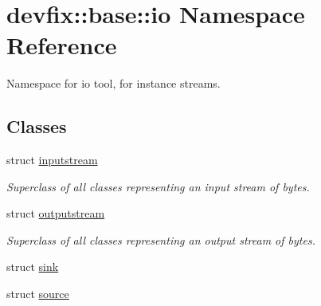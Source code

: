 \hypertarget{namespacedevfix_1_1base_1_1io}{}\section{devfix\+:\+:base\+:\+:io Namespace Reference}
\label{namespacedevfix_1_1base_1_1io}


Namespace for io tool, for instance streams.  


\subsection*{Classes}
\begin{DoxyCompactItemize}
\item 
struct \hyperlink{structdevfix_1_1base_1_1io_1_1inputstream}{inputstream}
\begin{DoxyCompactList}\small\item\em Superclass of all classes representing an input stream of bytes. \end{DoxyCompactList}\item 
struct \hyperlink{structdevfix_1_1base_1_1io_1_1outputstream}{outputstream}
\begin{DoxyCompactList}\small\item\em Superclass of all classes representing an output stream of bytes. \end{DoxyCompactList}\item 
struct \hyperlink{structdevfix_1_1base_1_1io_1_1sink}{sink}
\item 
struct \hyperlink{structdevfix_1_1base_1_1io_1_1source}{source}
\end{DoxyCompactItemize}
